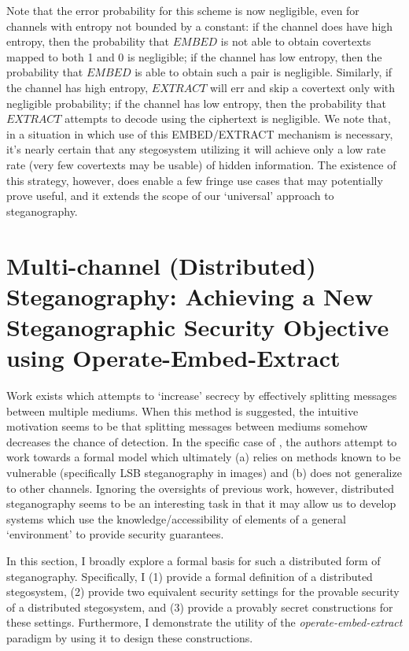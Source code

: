 \documentclass{article}
\begin{document}
Note that the error probability for this scheme is now negligible, even for channels with entropy not bounded by a constant: if the channel 
does have high entropy, then the probability that $EMBED$ is not able to obtain covertexts mapped to both 1 and 0 is negligible; if the channel 
has low entropy, then the probability that $EMBED$ is able to obtain such a pair is negligible.  Similarly, if the channel has high entropy, 
$EXTRACT$ will err and skip a covertext only with negligible probability; if the channel has low entropy, then the probability that $EXTRACT$ 
attempts to decode using the ciphertext is negligible.
\newline\newline
We note that, in a situation in which use of this EMBED/EXTRACT mechanism is necessary, it's nearly certain that any stegosystem utilizing it 
will achieve only a low rate rate (very few covertexts may be usable) of hidden information.  The existence of this strategy, however, 
does enable a few fringe use cases that may potentially prove useful, and it extends the scope of our `universal' approach to steganography.

\section{Multi-channel (Distributed) Steganography: Achieving a New Steganographic Security Objective using Operate-Embed-Extract}

Work exists \cite{DistSteg} which attempts to `increase' secrecy by effectively splitting messages between multiple mediums.  When this method 
is suggested, the intuitive motivation seems to be that splitting messages between mediums somehow decreases the chance of detection.  In the specific 
case of \cite{DistSteg}, the authors attempt to work towards a formal model which ultimately (a) relies on methods known to be vulnerable (specifically
LSB steganography in images) and (b) does not generalize to other channels.  Ignoring the oversights of previous work, however, distributed steganography 
seems to be an interesting task in that it may allow us to develop systems which use the knowledge/accessibility of elements of a general `environment' 
to provide security guarantees.

In this section, I broadly explore a formal basis for such a distributed form of steganography.  Specifically, I 
(1) provide a formal definition of a distributed stegosystem, (2) provide two equivalent security settings for the 
provable security of a distributed stegosystem, and (3) provide a provably secret constructions for these settings.
Furthermore, I demonstrate the utility of the \textit{operate-embed-extract} paradigm by using it to design these constructions.
\end{document}
